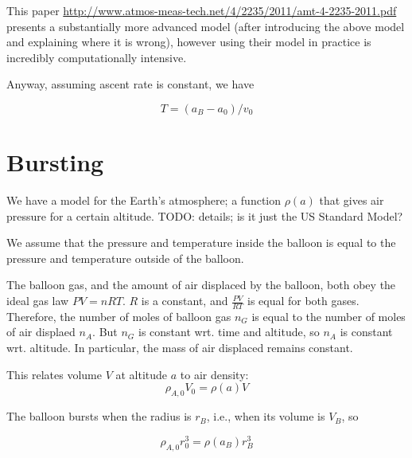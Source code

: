 \documentclass{article}
\begin{document}
This paper \url{http://www.atmos-meas-tech.net/4/2235/2011/amt-4-2235-2011.pdf} presents
a substantially more advanced model (after introducing the above model and explaining
where it is wrong), however using their model in practice is incredibly computationally
intensive.

Anyway, assuming ascent rate is constant, we have

\[  T = (a_B - a_0) / v_0 \]

\section{Bursting}

We have a model for the Earth's atmosphere; a function $\rho(a)$ that gives
air pressure for a certain altitude.
TODO: details; is it just the US Standard Model?

We assume that the pressure and temperature inside the balloon is equal
to the pressure and temperature outside of the balloon.

The balloon gas, and the amount of air displaced by the balloon, both
obey the ideal gas law $PV=nRT$. $R$ is a constant, and $\frac{PV}{RT}$ is
equal for both gases. Therefore, the number of moles of balloon gas $n_G$ is
equal to the number of moles of air displaed $n_A$. But $n_G$ is constant
wrt. time and altitude, so $n_A$ is constant wrt. altitude. In particular,
the mass of air displaced remains constant.

This relates volume $V$ at altitude $a$ to air density: 
\[
    \rho_{A,0} V_0 = \rho(a) V
\]

The balloon bursts when the radius is $r_B$, i.e., when its volume is $V_B$, so

\[
    \rho_{A,0} r_0^3 = \rho(a_B) r_B^3
\]
\end{document}
